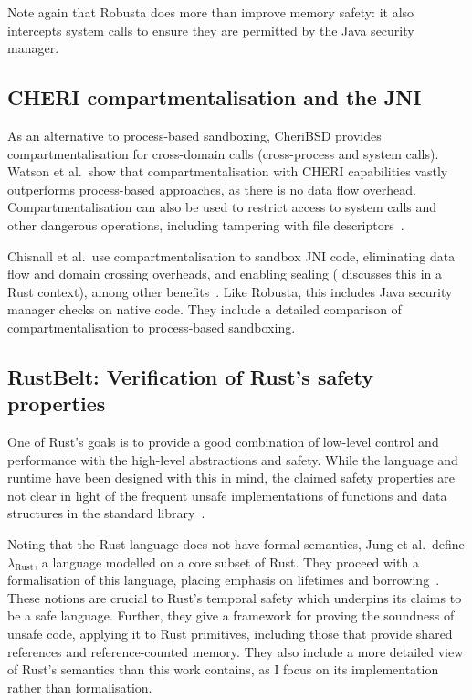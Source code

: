 \documentclass[dissertation.tex]{subfiles}
\begin{document}
Note again that Robusta does more than improve memory safety: it also
intercepts system calls to ensure they are permitted by the Java
security manager.


\subsection{CHERI compartmentalisation and the JNI}
\label{sec:rel-cheri-jni}

As an alternative to process-based sandboxing, CheriBSD provides
compartmentalisation for cross-domain calls (cross-process and system
calls).
Watson et al.\ show that compartmentalisation with CHERI capabilities
vastly outperforms process-based approaches, as there is no data flow
overhead.
Compartmentalisation can also be used to restrict access to system
calls and other dangerous operations, including tampering with file
descriptors~\cite{cheri2015}.

Chisnall et al.\ use compartmentalisation to sandbox JNI code, eliminating
data flow and domain crossing overheads, and enabling sealing
( discusses this in a Rust context), among
other benefits~\cite{cheri-jni}.
Like Robusta, this includes Java security manager checks on native code.
They include a detailed comparison of compartmentalisation to
process-based sandboxing.


\subsection{RustBelt: Verification of Rust's safety properties}

One of Rust's goals is to provide a good combination of low-level
control and performance with the high-level abstractions and safety.
While the language and runtime have been designed with this in mind,
the claimed safety properties are not clear in light of the frequent
unsafe implementations of functions and data structures in the standard
library~\cite{rustbelt-web}.

Noting that the Rust language does not have formal semantics, Jung et
al.\ define \(\lambda_\textrm{Rust}\), a language modelled on a core
subset of Rust.
They proceed with a formalisation of this language, placing emphasis on
lifetimes and borrowing~\cite{jung-rustbelt}.
These notions are crucial to Rust's temporal safety which underpins
its claims to be a safe language.
Further, they give a framework for proving the soundness of unsafe code,
applying it to Rust primitives, including those that provide shared
references and reference-counted memory.
They also include a more detailed view of Rust's semantics than this
work contains, as I focus on its implementation rather than
formalisation.
\end{document}
